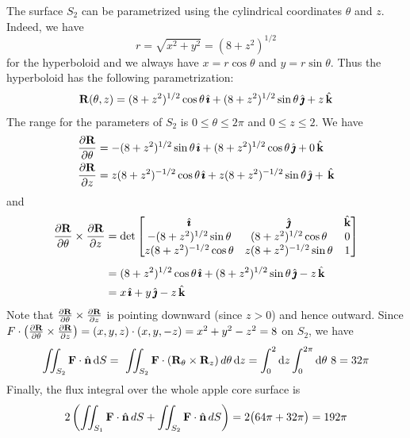 \begin{solution}
The surface $S_2$ can be parametrized using the cylindrical coordinates
$\theta$ and $z$. Indeed, we have 
\begin{equation*}
r= \sqrt {x^2+y^2}= (8+z^2)^{1/2}
\end{equation*}
for the hyperboloid  and we always have $x=r \cos \theta$ and 
$y= r \sin \theta$. 
Thus the hyperboloid has the following parametrization:
\begin{align*}
\mathbf{R}(\theta,z) = (8+z^2)^{1/2} \cos \theta \, \hat{\pmb{\imath}} + 
(8+z^2)^{1/2} \sin \theta \, \hat{\pmb{\jmath}} + z \,\hat{\mathbf{k}}
\end{align*}
The range for the parameters of $S_2$ is $0 \le \theta \le 2\pi$ and 
$0  \le z \le 2$. We have
\begin{align*}
\pdiff{\vR}{\theta} &= -(8+z^2)^{1/2} \sin \theta \, \hi +
                   (8+z^2)^{1/2} \cos \theta \, \hj + 0 \,\hk\\
\pdiff{\vR}{z} &= z(8+z^2)^{-1/2} \cos \theta \, \hi 
        + z(8+z^2)^{-1/2} \sin \theta \, \hj +  \,\hk
\end{align*}
and
\begin{align*}
\pdiff{\vR}{\theta} \times \pdiff{\vR}{z} 
&=\det\left[\begin{matrix}\hi & \hj & \hk\\
             -(8+z^2)^{1/2} \sin \theta & (8+z^2)^{1/2} \cos \theta  & 0 \\
           z(8+z^2)^{-1/2} \cos \theta & z(8+z^2)^{-1/2} \sin \theta & 1
    \end{matrix}\right] \\[0.05in]
&= (8+z^2)^{1/2} \cos \theta \,\hi + (8+z^2)^{1/2} \sin\theta\,\hj - z \,\hk \\
&=x\,\hi + y\,\hj -z\,\hk
\end{align*}
Note that $\pdiff{\vR}{\theta} \times \pdiff{\vR}{z}$ is pointing 
downward (since $z>0$) and hence outward. 
Since $F \cdot \left(\pdiff{\vR}{\theta} \times \pdiff{\vR}{z} \right) 
= (x,y,z) \cdot (x,y,-z) =  x^2 + y^2 - z^2 = 8$ on $S_2$,
we have
\begin{equation*}
 \iint_{S_2}\mathbf{F}\cdot\hat{\mathbf{n}} \,\mathrm{d}S
=  \ \iint_{S_2} \mathbf{F} \cdot (\mathbf{R}_\theta \times \mathbf{R}_z) \, d \theta\, \mathrm{d}z   
=\int_0^2 \mathrm{d}z \int_0^{2\pi}\mathrm{d}\theta\ 8   
= 32 \pi
\end{equation*}
Finally, the flux integral over the whole apple core surface is  
\begin{equation*}
2  \left(\iint_{S_1}\mathbf{F}\cdot\hat{\mathbf{n}} \,dS
+ \iint_{S_2}\mathbf{F}\cdot\hat{\mathbf{n}} \,dS\right) 
= 2\big(64\pi+32\pi\big)
=192\pi
\end{equation*}
\end{solution}



